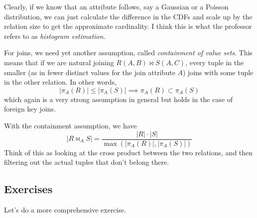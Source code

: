 \documentclass{article}
\begin{document}
      Clearly, if we know that an attribute follows, say a Gaussian or a Poisson distribution, we can just calculate the difference in the CDFs and scale up by the relation size to get the approximate cardinality. I think this is what the professor refers to as \textit{histogram estimation}. 

      For joins, we need yet another assumption, called \textit{containment of value sets}. This means that if we are natural joining $R(A, B) \bowtie S(A, C)$, every tuple in the smaller (as in fewer distinct values for the join attribute $A$) joins with some tuple in the other relation. In other words, 
      \begin{equation}
        |\pi_A (R)| \leq |\pi_A (S)| \implies \pi_A (R) \subset \pi_A (S)
      \end{equation}
      which again is a very strong assumption in general but holds in the case of foreign key joins. 

      \begin{example} 
        With the containment assumption, we have 
        \begin{equation}
          |R \bowtie_{A} S| = \frac{|R| \cdot |S|}{\max( |\pi_A (R)|, |\pi_A(S)|)}
        \end{equation} 
        Think of this as looking at the cross product between the two relations, and then filtering out the actual tuples that don't belong there.  
      \end{example}

  \subsection{Exercises} 

    Let's do a more comprehensive exercise. 
\end{document}
